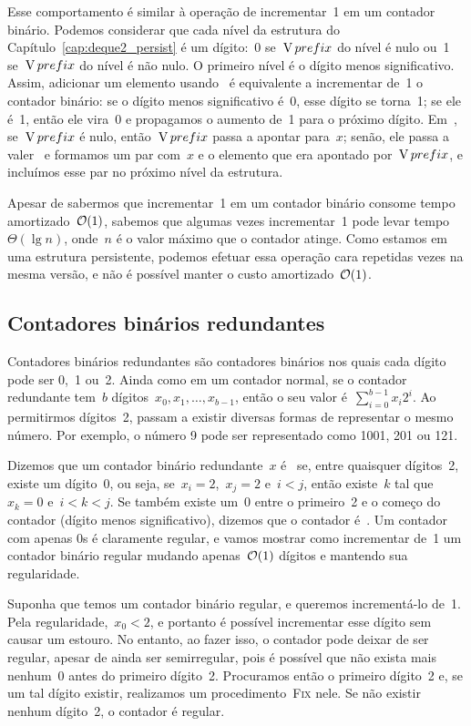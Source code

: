 \documentclass[../../main.tex]{subfiles}
\begin{document}
Esse comportamento é similar à operação de incrementar~1 em um contador binário. Podemos considerar que cada nível da estrutura do Capítulo~\ref{cap:deque2_persist} é um dígito:~0 se~$\operatorname{V}{prefix}$ do nível é nulo ou~1 se~$\operatorname{V}{prefix}$ do nível é não nulo. O primeiro nível é o dígito menos significativo. Assim, adicionar um elemento usando~ é equivalente a incrementar de~1 o contador binário:
se o dígito menos significativo é~0, esse dígito se torna~1; se ele é~1, então ele vira~0 e propagamos o aumento de~1 para o próximo dígito. Em~, se~$\operatorname{V}{prefix}$ é nulo, então~$\operatorname{V}{prefix}$ passa a apontar para~$x$; senão, ele passa a valer~ e formamos um par com~$x$ e o elemento que era apontado por~$\operatorname{V}{prefix}$, e incluímos esse par no próximo nível da estrutura.

Apesar de sabermos que incrementar~1 em um contador binário consome tempo amortizado~$\mathcal{O}(1)$, sabemos que algumas vezes incrementar~1 pode levar tempo~$\Theta(\lg n)$, onde~$n$ é o valor máximo que o contador atinge. Como estamos em uma estrutura persistente, podemos efetuar essa operação cara repetidas vezes na mesma versão, e não é possível manter o custo amortizado~$\mathcal{O}(1)$.

\subsection{Contadores binários redundantes} \label{subsec:contbin_redun}

Contadores binários redundantes são contadores binários nos quais cada dígito pode ser 0,~1 ou~2. Ainda como em um contador normal, se o contador redundante tem~$b$ dígitos~$x_0, x_1, \ldots, x_{b-1}$, então o seu valor é~$\sum\limits_{i=0}^{b-1}{x_i 2^i}$. Ao permitirmos dígitos~2, passam a existir diversas formas de representar o mesmo número. Por exemplo, o número 9 pode ser representado como 1001, 201 ou 121.

Dizemos que um contador binário redundante~$x$ é~ se, entre quaisquer dígitos~2, existe um dígito~0, ou seja, se~${x_i = 2}$,~${x_j = 2}$ e~$i < j$, então existe~$k$ tal que~${x_k = 0}$ e~${i < k < j}$. Se também existe um~0 entre o primeiro~2 e o começo do contador (dígito menos significativo), dizemos que o contador é~. Um contador com apenas 0s é claramente regular, e vamos mostrar como incrementar de~1 um contador binário regular mudando apenas~$\mathcal{O}(1)$ dígitos e mantendo sua regularidade.

Suponha que temos um contador binário regular, e queremos incrementá-lo de~1. Pela regularidade,~${x_0 < 2}$, e portanto é possível incrementar esse dígito sem causar um estouro. No entanto, ao fazer isso, o contador pode deixar de ser regular, apesar de ainda ser semirregular, pois é possível que não exista mais nenhum~0 antes do primeiro dígito~2. Procuramos então o primeiro dígito~2 e, se um tal dígito existir, realizamos um procedimento~\textsc{Fix} nele. Se não existir nenhum dígito~2, o contador é regular.
\end{document}
